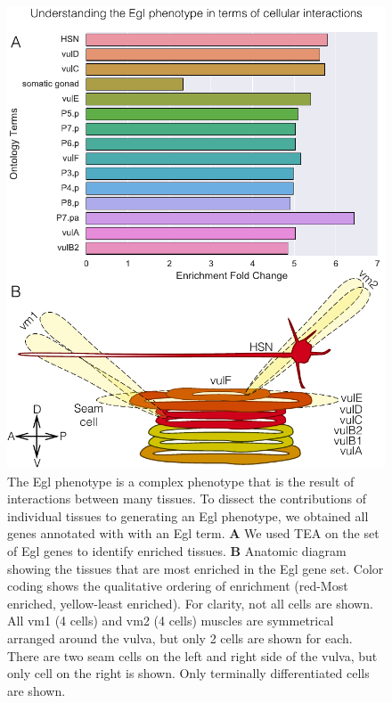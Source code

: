 \documentclass[10pt, onecolumn]{article}
\begin{document}
\begin{figure}[htbp]
  \renewcommand{\familydefault}{\sfdefault}\normalfont{}
  \centering
  \includegraphics[width=.6\linewidth]{Egl-phenotype.pdf}
  \caption{The Egl phenotype is a complex phenotype that is the result of
  interactions between many tissues. To dissect the contributions of individual
  tissues to generating an Egl phenotype, we obtained all genes annotated with
  with an Egl term. \textbf{A} We used TEA on the set of Egl genes to identify
  enriched tissues. \textbf{B} Anatomic diagram showing the tissues that are
  most enriched in the Egl gene set. Color coding shows the qualitative
  ordering of enrichment (red-Most enriched, yellow-least enriched). For clarity,
  not all cells are shown. All vm1 (4 cells) and vm2 (4 cells) muscles are
  symmetrical arranged around the vulva, but only 2 cells are shown for each.
  There are two seam cells on the left and right side of the vulva, but only
  cell on the right is shown. Only terminally differentiated cells are shown.}
\label{fig:egl}
\end{figure}
\end{document}
